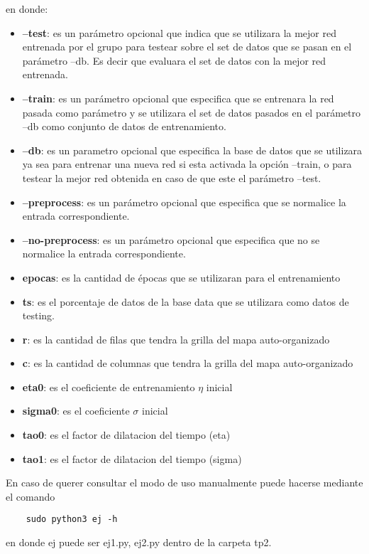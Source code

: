 en donde:
\begin{itemize}
  \item \textbf{--test}: es un parámetro opcional que indica que se utilizara la mejor red entrenada por el grupo para testear sobre el set de datos que se pasan en el parámetro
  --db. Es decir que evaluara el set de datos con la mejor red entrenada.
  \item \textbf{--train}: es un parámetro opcional que especifica que se entrenara la red pasada como parámetro y se utilizara el set de datos pasados en el parámetro --db
  como conjunto de datos de entrenamiento.
  \item \textbf{--db}: es un parametro opcional que especifica la base de datos que se utilizara ya sea para entrenar una nueva red si esta activada la opción --train, o
  para testear la mejor red obtenida en caso de que este el parámetro --test.
  \item \textbf{--preprocess}: es un parámetro opcional que especifica que se normalice la entrada correspondiente.
  \item \textbf{--no-preprocess}: es un parámetro opcional que especifica que no se normalice la entrada correspondiente.
  \item \textbf{epocas}: es la cantidad de épocas que se utilizaran para el entrenamiento
  \item \textbf{ts}: es el porcentaje de datos de la base data que se utilizara como datos de testing.
  \item \textbf{r}: es la cantidad de filas que tendra la grilla del mapa auto-organizado
  \item \textbf{c}: es la cantidad de columnas que tendra la grilla del mapa auto-organizado
  \item \textbf{eta0}: es el coeficiente de entrenamiento $\eta$ inicial
  \item \textbf{sigma0}: es el coeficiente $\sigma$ inicial
  \item \textbf{tao0}: es el factor de dilatacion del tiempo (eta)
  \item \textbf{tao1}: es el factor de dilatacion del tiempo (sigma)


\end{itemize}

En caso de querer consultar el modo de uso manualmente puede hacerse mediante el comando
\begin{verbatim}
    sudo python3 ej -h
\end{verbatim}
en donde ej puede ser {ej1.py, ej2.py} dentro de la carpeta tp2.

\newpage
